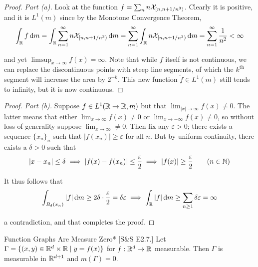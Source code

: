 \begin{proof}
    \textit{Part (a).} Look at the function \(f = \sum_{n} n \mathcal{X}_{[n, n+1/n^3)}\). Clearly it is positive, and it is \(L^1(m)\) since by the Monotone Convergence Theorem, 
    \[
        \int_{\mathbb{R}} f \, \mathrm{d}m
        = \int_{\mathbb{R}} \sum_{n=1}^\infty n \mathcal{X}_{[n, n + 1/n^3)} \, \mathrm{d}m
        = \sum_{n=1}^\infty \int_{\mathbb{R}} n \mathcal{X}_{[n, n + 1/n^3)} \, \mathrm{d}m
        = \sum_{n=1}^\infty \frac{1}{n^2}
        < \infty
    \]

    and yet \(\limsup_{x \to \infty} f(x) = \infty\). Note that while \(f\) itself is not continuous, we can replace the discontinuous points with steep line segments, of which the \(k^{\text{th}}\) segment will increase the area by \(2^{-k}\). This new function \(\tilde{f} \in L^1(m)\) still tends to infinity, but it is now continuous. 
\end{proof}

\begin{proof}
    \textit{Part (b).} Suppose \(f \in L^1(\mathbb{R} \to \mathbb{R}, m)\) but that \(\lim_{|x| \to \infty} f(x) \neq 0\). The latter means that either \(\lim_{x \to \infty} f(x) \neq 0\) or \(\lim_{x \to -\infty} f(x) \neq 0\), so without loss of generality suppose \(\lim_{x \to \infty} \neq 0\). Then fix any \(\varepsilon > 0\); there exists a sequence \(\{x_n\}_n\) such that \(|f(x_n)| \geq \varepsilon\) for all \(n\). But by uniform continuity, there exists a \(\delta > 0\) such that 
    \[
        |x - x_n| \leq \delta \implies |f(x) - f(x_n)| \leq \frac{\varepsilon}{2} \implies |f(x)| \geq \frac{\varepsilon}{2}
        \qquad (n \in \mathbb{N})
    \]

    It thus follows that 
    \[
    \int_{B_{\delta}(x_n)} |f| \, \mathrm{d}m \geq 2\delta \cdot \frac{\varepsilon}{2} = \delta \varepsilon
    \implies \int_{\mathbb{R}} |f| \, \mathrm{d}m \geq \sum_{n \geq 1} \delta \varepsilon = \infty
    \]

    a contradiction, and that completes the proof. 
\end{proof}

\begin{problem}{Function Graphs Are Measure Zero}*
    [S\&S E2.7.] Let \(\Gamma = \{(x, y) \in \mathbb{R}^d \times \mathbb{R} \mid y = f(x) \}\) for \(f : \mathbb{R}^d \to \mathbb{R}\) measurable. Then \(\Gamma\) is measurable in \(\mathbb{R}^{d+1}\) and \(m(\Gamma) = 0\).
\end{problem}

